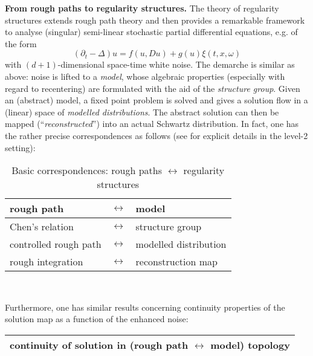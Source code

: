 \documentclass{article}
\begin{document}
\bigskip \textbf{From rough paths to regularity structures.} The theory of
regularity structures \cite{Hairer14} extends rough path theory and then provides a
remarkable framework to analyse (singular) semi-linear stochastic partial differential
equations, e.g. of the form%
\[
\left( \partial _{t}-\Delta \right) u=f\left( u,Du\right) +g\left( u\right)
\xi \left( t,x,\omega \right) 
\]%
with $\left( d+1\right) $-dimensional space-time white noise. The demarche
is similar as above: noise is lifted to a {\it model}, whose algebraic properties
(especially with regard to recentering) are formulated with the aid of the
{\it structure group}. Given an (abstract) model, a fixed point problem is solved and gives a solution flow in a
(linear) space of {\it modelled distributions}. The abstract solution can then be mapped (``{\it reconstructed}\hspace{0.4mm}'') into an actual Schwartz distribution. In fact,
one has the rather precise correspondences as follows (see \cite{FrizHairer14} for explicit
details in the level-2 setting): 

\begin{table}[!htbp]
\centering
\begin{tabular}{|lll|}
\hline
    rough path                   &      $\longleftrightarrow$                 &  model \\ \hline
     Chen's relation                  &      $\longleftrightarrow$           & structure group \\ \hline
     controlled rough path                  &      $\longleftrightarrow$                &  modelled
distribution \\ \hline
       rough integration                 &   $\longleftrightarrow$               &  reconstruction map \\ \hline
\end{tabular}
\\
\caption{Basic correspondences: rough paths $\longleftrightarrow$  regularity structures}
\label{my-label}

\end{table}
\noindent Furthermore, one has similar results concerning continuity properties of the solution
map as a function of the enhanced noise:%

\begin{table}[!htbp]
\centering
\begin{tabular}{|l|}
\hline
   continuity of solution in (rough path $\longleftrightarrow $ model) topology \\ \hline
\end{tabular}
\end{table}
\end{document}

